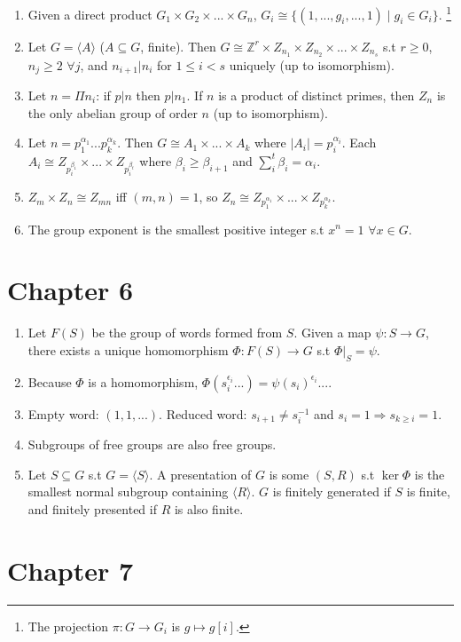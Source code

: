 \documentclass{article}
\begin{document}
\begin{enumerate}[1.]
    \item Given a direct product $G_1 \times G_2 \times ... \times G_n$,
        $G_i \cong \{(1, ..., g_i, ..., 1) \mid g_i \in G_i\}$.
        \footnote{The projection $\pi : G \rightarrow G_i$ is $g \mapsto
        g[i]$.}
    \item Let $G = \langle A \rangle$ ($A \subseteq G$, finite). Then $G \cong
        \mathbb{Z}^r \times Z_{n_1} \times Z_{n_2} \times ... \times
        Z_{n_s}$ s.t $r \geq 0$, $n_j \geq 2$ $\forall j$, and $n_{i+1} |
        n_i$ for $1 \leq i < s$ uniquely (up to isomorphism).
    \item Let $n = \Pi n_i$: if $p | n$ then $p | n_1$. If $n$ is a product
        of distinct primes, then $Z_n$ is the only abelian group of order
        $n$ (up to isomorphism).
    \item Let $n = p_1^{\alpha_1}...p_k^{\alpha_k}$. Then $G \cong A_1
        \times ... \times A_k$ where $|A_i| = p_i^{\alpha_i}$. Each $A_i
        \cong Z_{p_i^{\beta_1}} \times ... \times Z_{p_i^{\beta_t}}$ where
        $\beta_i \geq \beta_{i+1}$ and $\sum_i^t \beta_i = \alpha_i$.
    \item $Z_m \times Z_n \cong Z_{mn}$ iff $(m, n) = 1$, so $Z_n \cong
        Z_{p_1^{\alpha_1}} \times ... \times Z_{p_k^{\alpha_k}}$.
    \item The group exponent is the smallest positive integer s.t $x^n = 1$
        $\forall x \in G$.
\end{enumerate}

\section*{Chapter 6}

\begin{enumerate}[1.]
    \item Let $F(S)$ be the group of words formed from $S$.
        Given a map $\psi : S \rightarrow G$, there exists a unique
        homomorphism $\Phi : F(S) \rightarrow G$ s.t $\Phi|_S = \psi$.
    \item Because $\Phi$ is a homomorphism, $\Phi(s_i^{\epsilon_i} ...) =
        \psi(s_i)^{\epsilon_i} ...$.
    \item Empty word: $(1, 1, ...)$. Reduced word: $s_{i+1} \not= s_i^{-1}$
        and $s_i = 1 \Rightarrow s_{k \geq i} = 1$.
    \item Subgroups of free groups are also free groups.
    \item Let $S \subseteq G$ s.t $G = \langle S \rangle$. A presentation of
        $G$ is some $(S, R)$ s.t $\ker \Phi$ is the smallest normal subgroup
        containing $\langle R \rangle$. $G$ is finitely generated if $S$ is
        finite, and finitely presented if $R$ is also finite.
\end{enumerate}

\section*{Chapter 7}
\end{document}
